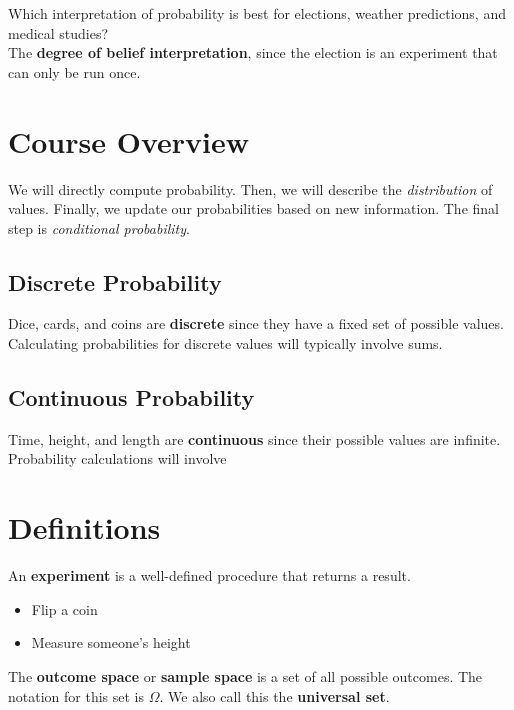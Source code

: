 \documentclass[titlepage, 12pt, leqno]{article}
\begin{document}
\begin{ex}
    Which interpretation of probability is best for elections, weather predictions, and medical studies? \\[.1in]
    The \textbf{degree of belief interpretation}, since the election is an experiment that can only be run once.
\end{ex}

\pagebreak
\section{Course Overview}
We will directly compute probability. Then, we will describe the \textit{distribution} of values. Finally, we update our probabilities based on new information. The final step is \textit{conditional probability}.

\subsection{Discrete Probability}
Dice, cards, and coins are \textbf{discrete} since they have a fixed set of possible values. Calculating probabilities for discrete values will typically involve sums.

\subsection{Continuous Probability}
Time, height, and length are \textbf{continuous} since their possible values are infinite. Probability calculations will involve

\section{Definitions}
\begin{definition}
    An \textbf{experiment} is a well-defined procedure that returns a result.
    \begin{itemize}
        \item Flip a coin
        \item Measure someone's height
    \end{itemize}
\end{definition}

\begin{definition}
    The \textbf{outcome space} or \textbf{sample space} is a set of all possible outcomes. The notation for this set is $\Omega$. We also call this the \textbf{universal set}.
\end{definition}
\end{document}
